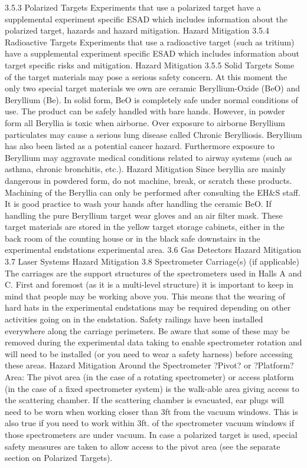 {{{3.5.3	Polarized Targets
	Experiments that use a polarized target have a supplemental experiment specific ESAD
which includes information about the polarized target, hazards and hazard mitigation.
Hazard Mitigation
3.5.4	Radioactive Targets 
	Experiments that use a radioactive target (such as tritium) have a supplemental experiment specific ESAD which includes information about target specific risks and mitigation.
Hazard Mitigation
3.5.5	Solid Targets
	Some of the target materials may pose a serious safety concern. At this moment the only two special target materials we own are ceramic Beryllium-Oxide (BeO) and Beryllium (Be). In solid form, BeO is completely safe under normal conditions of use. The product can be safely handled with bare hands. However, in powder form all Beryllia is toxic when airborne. Over exposure to airborne Beryllium particulates may cause a serious lung disease called Chronic Berylliosis. Beryllium has also been listed as a potential cancer hazard. Furthermore exposure to Beryllium may aggravate medical conditions related to airway systems (such as asthma, chronic bronchitis, etc.). 
Hazard Mitigation
	Since beryllia are mainly dangerous in powdered form, do not machine, break, or scratch these products. Machining of the Beryllia can only be performed after consulting the EH\&S staff. It is good practice to wash your hands after handling the ceramic BeO. If handling the pure Beryllium target wear gloves and an air filter mask. These target materials are stored in the yellow target storage cabinets, either in the back room of the counting house or in the black safe downstairs in the experimental endstations experimental area. 
3.6	Gas Detectors
Hazard Mitigation
3.7	Laser Systems
Hazard Mitigation
3.8 	Spectrometer Carriage(s) (if applicable)
	The carriages are the support structures of the spectrometers used in Halls A and C. First and foremost (as it is a multi-level structure) it is important to keep in mind that people may be working above you. This means that the wearing of hard hats in the experimental endstations may be required depending on other activities going on in the endstation. Safety railings have been installed everywhere along the carriage perimeters. Be aware that some of these may be removed during the experimental data taking to enable spectrometer rotation and will need to be installed (or you need to wear a safety harness) before accessing these areas.
Hazard Mitigation
	Around the Spectrometer ?Pivot? or ?Platform? Area: The pivot area (in the case of a rotating spectrometer) or access platform (in the case of a fixed spectrometer system) is the walk-able area giving access to the scattering chamber. If the scattering chamber is evacuated, ear plugs will need to be worn when working closer than 3ft from the vacuum windows. This is also true if you need to work within 3ft. of the spectrometer vacuum windows if those spectrometers are under vacuum. In case a polarized target is used, special safety measures are taken to allow access to the pivot area (see the separate section on Polarized Targets).
}}}
